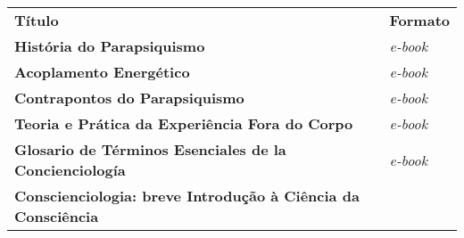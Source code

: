 \documentclass[
]{article}
\begin{document}
\begin{longtable}[]{@{}
  >{\raggedright\arraybackslash}p{}
  >{\raggedright\arraybackslash}p{}@{}}
\toprule\noalign{}
\begin{minipage}[b]{\linewidth}\centering
\textbf{Título}
\end{minipage} & \begin{minipage}[b]{\linewidth}\centering
\textbf{Formato}
\end{minipage} \\
\begin{minipage}[b]{\linewidth}\raggedright
\textbf{História do Parapsiquismo}
\end{minipage} & \begin{minipage}[b]{\linewidth}\raggedright
\emph{e-book}
\end{minipage} \\
\begin{minipage}[b]{\linewidth}\raggedright
\textbf{Acoplamento Energético}
\end{minipage} & \begin{minipage}[b]{\linewidth}\raggedright
\emph{e-book}
\end{minipage} \\
\begin{minipage}[b]{\linewidth}\raggedright
\textbf{Contrapontos do Parapsiquismo}
\end{minipage} & \begin{minipage}[b]{\linewidth}\raggedright
\emph{e-book}
\end{minipage} \\
\begin{minipage}[b]{\linewidth}\raggedright
\textbf{Teoria e Prática da Experiência Fora do Corpo}
\end{minipage} & \begin{minipage}[b]{\linewidth}\raggedright
\emph{e-book}
\end{minipage} \\
\begin{minipage}[b]{\linewidth}\raggedright
\textbf{Glosario de Términos Esenciales de la Concienciología}
\end{minipage} & \begin{minipage}[b]{\linewidth}\raggedright
\emph{e-book}
\end{minipage} \\
\begin{minipage}[b]{\linewidth}\raggedright
\textbf{Conscienciologia: breve Introdução à Ciência da Consciência}

\end{minipage}
\end{longtable}
\end{document}
